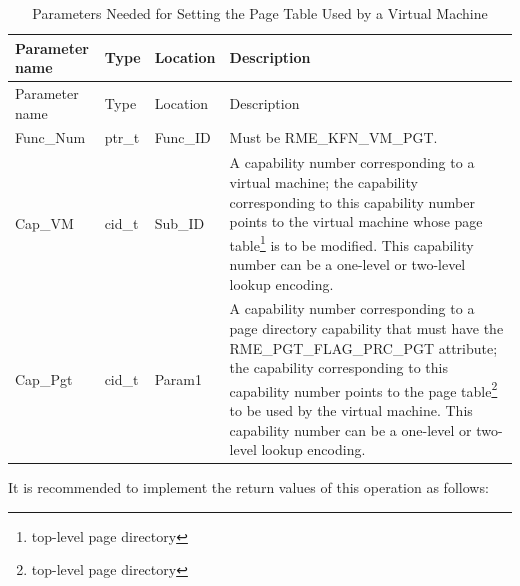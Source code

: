 \begin{xltabular}{\textwidth}{@{}>{\hsize\raggedright\arraybackslash}X>{\hsize\raggedright\arraybackslash}X>{\hsize\raggedright\arraybackslash}X>{\hsize\raggedright\arraybackslash}X@{}}
\caption{Parameters Needed for Setting the Page Table Used by a Virtual Machine}\label{tab:8-77-set-virtual-machine-page-table-parameters}\\
\toprule
Parameter name & Type & Location & Description\tabularnewline
\endfirsthead
\toprule
Parameter name & Type & Location & Description\tabularnewline
\midrule
\endhead
\bottomrule
\endlastfoot
Func\_Num & ptr\_t & Func\_ID & Must be RME\_KFN\_VM\_PGT.\tabularnewline
Cap\_VM & cid\_t & Sub\_ID &
A capability number corresponding to a virtual machine; the capability corresponding to this capability number points to the virtual machine whose page table\footnote{top-level page directory} is to be modified. This capability number can be a one-level or two-level lookup encoding.\tabularnewline
Cap\_Pgt & cid\_t & Param1 &
A capability number corresponding to a page directory capability that must have the RME\_PGT\_FLAG\_PRC\_PGT attribute; the capability corresponding to this capability number points to the page table\footnote{top-level page directory} to be used by the virtual machine. This capability number can be a one-level or two-level lookup encoding.\tabularnewline
\end{xltabular}
\nopagebreak[4]

It is recommended to implement the return values of this operation as follows:

